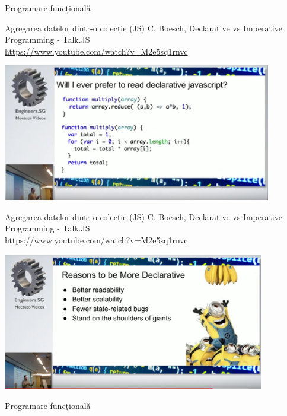 \documentclass[xcolor=pdftex,romanian,colorlinks]{beamer}
\begin{document}
\begin{section}{Programare funcțională}
\begin{frame}[fragile]{Agregarea datelor dintr-o colecție (JS)}{
C. Boesch, Declarative vs Imperative Programming - Talk.JS\\
\url{https://www.youtube.com/watch?v=M2e5sq1rnvc}}
\begin{center}
\includegraphics[height=6cm]{fd.png}
\end{center}
\end{frame}

\begin{frame}[fragile]{Agregarea datelor dintr-o colecție (JS)}{
C. Boesch, Declarative vs Imperative Programming - Talk.JS\\
\url{https://www.youtube.com/watch?v=M2e5sq1rnvc}}

\begin{center}
\includegraphics[height=6cm]{giant.png}
\end{center}
\end{frame}



\begin{frame}{Programare funcțională}
\begin{itemize}


\end{itemize}
\end{frame}
\end{section}
\end{document}
